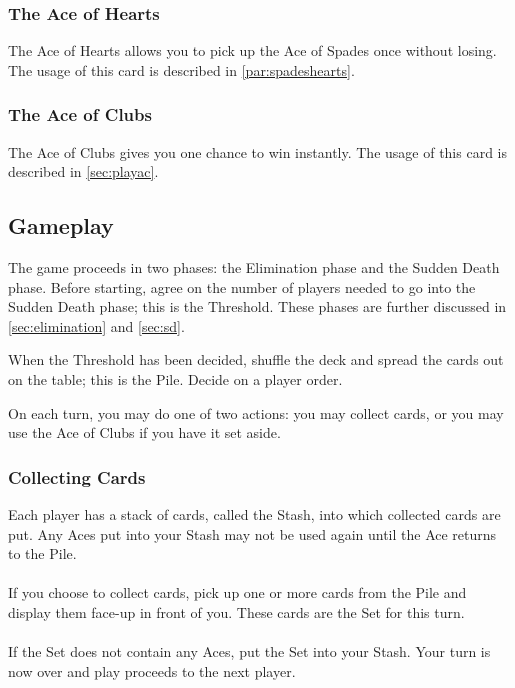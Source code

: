 \documentclass{article}
\begin{document}
\subsubsection{The Ace of Hearts}
The Ace of Hearts allows you to pick up the Ace of Spades once without
losing. The usage of this card is described in \ref{par:spadeshearts}.

\subsubsection{The Ace of Clubs}
The Ace of Clubs gives you one chance to win instantly. The usage of
this card is described in \ref{sec:playac}.

\subsection{Gameplay}
\label{sec:gameplay}

The game proceeds in two phases: the Elimination phase and the Sudden
Death phase. Before starting, agree on the number of players needed to
go into the Sudden Death phase; this is the Threshold. These phases are
further discussed in \ref{sec:elimination} and \ref{sec:sd}.

When the Threshold has been decided, shuffle the deck and spread the
cards out on the table; this is the Pile. Decide on a player order.

On each turn, you may do one of two actions: you may collect cards, or
you may use the Ace of Clubs if you have it set aside.

\subsubsection{Collecting Cards}
\label{sec:collecting}

Each player has a stack of cards, called the Stash, into which collected
cards are put. Any Aces put into your Stash may not be used again until
the Ace returns to the Pile.

\paragraph{}
\label{par:set}
If you choose to collect cards, pick up one or more cards from the Pile
and display them face-up in front of you. These cards are the Set for
this turn.

\paragraph{}
If the Set does not contain any Aces, put the Set into your Stash.
Your turn is now over and play proceeds to the next player. 
\end{document}
